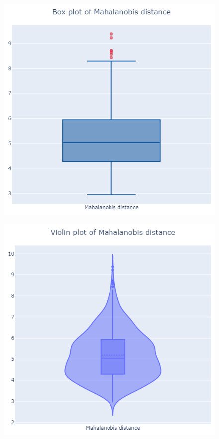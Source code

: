 \documentclass[letterpaper]{article}
\begin{document}
	\begin{figure}
		\centering
	\begin{minipage}[c]{0.45\textwidth}
			\includegraphics[width=\textwidth]{images/mahalanobis.png}
			\label{fig:7}
	\end{minipage}
	\begin{minipage}{0.05\textwidth}
		\quad
	\end{minipage}
	\begin{minipage}[c]{0.45\textwidth}
			\includegraphics[width=\textwidth]{images/mahalanobis_violin.png}
			\label{fig:8}
	\end{minipage}
	\end{figure}
\end{document}
